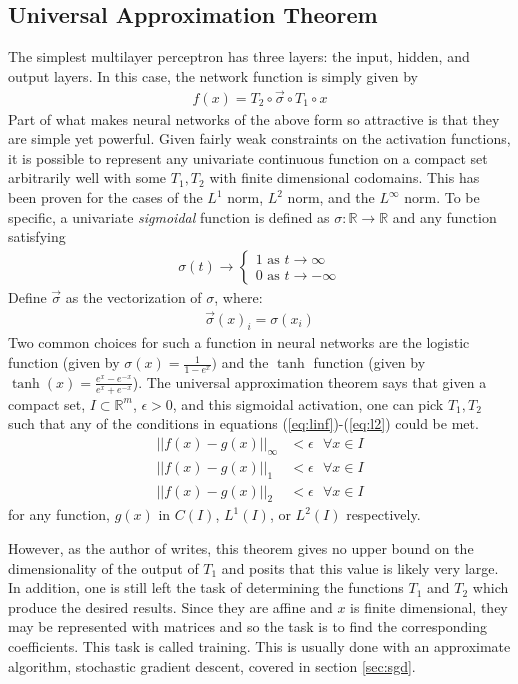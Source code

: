 \subsection{Universal Approximation Theorem}
The simplest multilayer perceptron has three layers: the input, hidden, and output layers.  In this case, the network function is simply given by
\begin{align}
f(x) = T_2 \circ \vec{\sigma} \circ T_1 \circ x
\end{align}
Part of what makes neural networks of the above form so attractive is that they are simple yet powerful.  Given fairly weak constraints on the activation functions, it is possible to represent any univariate continuous function on a compact set arbitrarily well with some $T_1,T_2$ with finite dimensional codomains. \cite{gc89} This has been proven for the cases of the $L^1$ norm, $L^2$ norm, and the $L^\infty$ norm.  To be specific, a univariate \textit{sigmoidal} function is defined as $\sigma: \mathbb{R}\rightarrow \mathbb{R}$ and any function satisfying
\begin{align}
\sigma(t) \rightarrow
\begin{cases}
1 \text{ as } t\rightarrow \infty\\
0 \text{ as } t\rightarrow -\infty
\end{cases}
\end{align}
Define $\vec{\sigma}$ as the vectorization of $\sigma$, where:
\begin{align}
\vec{\sigma}(x)_i = \sigma(x_i)
\end{align}
Two common choices for such a function in neural networks are the logistic function (given by $\sigma(x) = \frac{1}{1-e^x})$ and the $\tanh$ function (given by $\tanh(x) = \frac{e^x - e^{-x}}{e^x + e^{-x}}$).  The universal approximation theorem says that given a compact set, $I\subset \mathbb{R}^m$, $\epsilon > 0$, and this sigmoidal activation, one can pick $T_1,T_2$ such that any of the conditions in equations (\ref{eq:linf})-(\ref{eq:l2}) could be met.
\begin{align}
\label{eq:linf}||f(x) - g(x)||_\infty &< \epsilon \text{ } \forall x\in I \\
\label{eq:l1}||f(x) - g(x)||_1 &< \epsilon \text{ } \forall x\in I\\
\label{eq:l2}||f(x) - g(x)||_2 &< \epsilon \text{ } \forall x\in I
\end{align}
for any function, $g(x)$ in $C(I)$, $L^1(I)$, or $L^2(I)$ respectively.

However, as the author of \cite{gc89} writes, this theorem gives no upper bound on the dimensionality of the output of $T_1$ and posits that this value is likely very large.  In addition, one is still left the task of determining the functions $T_1$ and $T_2$ which produce the desired results.  Since they are affine and $x$ is finite dimensional, they may be represented with matrices and so the task is to find the corresponding coefficients.  This task is called training.  This is usually done with an approximate algorithm, stochastic gradient descent, covered in section \ref{sec:sgd}.  

